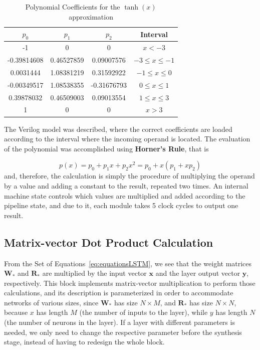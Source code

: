 \documentclass[conference]{IEEEtran}
\newcommand{\mb}[1]{\mathbf{#1}}
\begin{document}
\begin{table}
	\caption{Polynomial Coefficients for the $\tanh(x)$ approximation}
	\label{tab:coefs-tanh}
    \centering
  \begin{tabular}{ | c | c | c | c | }
    \hline
    $p_0$      &  $p_1$     &  $p_2$        &  Interval  \\
		\hline
    -1          & 0          &  0             & $x < -3$ \\
    \hline
    -0.39814608 & 0.46527859 &  0.09007576   & $-3 \leq x \leq -1$ \\
    \hline
		0.0031444 & 1.08381219 & 0.31592922      & $-1 \leq  x \leq 0$ \\
		\hline
		-0.00349517 & 1.08538355 & -0.31676793   &  $0 \leq  x \leq 1$ \\
		\hline
		0.39878032 & 0.46509003 & 0.09013554     & $1 \leq  x \leq 3$ \\
		\hline
		1         &  0         &   0             & $x > 3$ \\
		\hline
  \end{tabular}
\end{table}
The Verilog model was described, where the correct
coefficients are loaded according to the interval where the incoming operand is located. The evaluation of the polynomial
was accomplished using \textbf{Horner's Rule}, that is

\begin{equation}\label{eq:factorPol}
p(x) = p_0 + p_1x + p_2x^2 = p_0 + x(p_1 + xp_2)
\end{equation}
and, therefore, the calculation is simply the procedure of multiplying the operand by a value and adding a constant to the result,
repeated two times. An internal machine state controls which values are multiplied and added according to the pipeline state, and due to it,
each module takes 5 clock cycles to output one result.


\subsection{Matrix-vector Dot Product Calculation}\label{sec:proprarch_dot}
From the Set of Equations~\ref{eq:equationsLSTM}, we see that the weight matrices $\mb{W}_*$ and $\mb{R}_*$ are
multiplied by the input vector $\mb{x}$ and the layer output vector $\mb{y}$, respectively. This block implements
matrix-vector multiplication to perform those calculations, and its description is parameterized in
order to accommodate networks of various sizes, since $\mb{W}_*$ has size $N\times M$, and $\mb{R}_*$
has size $N\times N$, because $x$ has length $M$ (the number of inputs to the layer), while $y$ has length $N$
(the number of neurons in the layer). If a layer with different parameters is needed, we only need to change the respective parameter before the synthesis stage,
instead of having to redesign the whole block.
\end{document}
